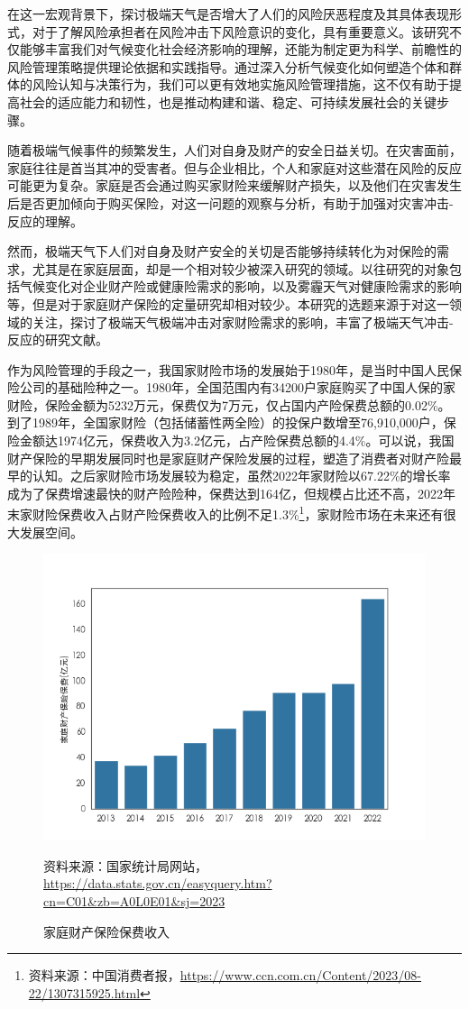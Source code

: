 在这一宏观背景下，探讨极端天气是否增大了人们的风险厌恶程度及其具体表现形式，对于了解风险承担者在风险冲击下风险意识的变化，具有重要意义。该研究不仅能够丰富我们对气候变化社会经济影响的理解，还能为制定更为科学、前瞻性的风险管理策略提供理论依据和实践指导。通过深入分析气候变化如何塑造个体和群体的风险认知与决策行为，我们可以更有效地实施风险管理措施，这不仅有助于提高社会的适应能力和韧性，也是推动构建和谐、稳定、可持续发展社会的关键步骤。

随着极端气候事件的频繁发生，人们对自身及财产的安全日益关切。在灾害面前，家庭往往是首当其冲的受害者。但与企业相比，个人和家庭对这些潜在风险的反应可能更为复杂。家庭是否会通过购买家财险来缓解财产损失，以及他们在灾害发生后是否更加倾向于购买保险，对这一问题的观察与分析，有助于加强对灾害冲击-反应的理解。

然而，极端天气下人们对自身及财产安全的关切是否能够持续转化为对保险的需求，尤其是在家庭层面，却是一个相对较少被深入研究的领域。以往研究的对象包括气候变化对企业财产险\citep{杨娜娜2019自然灾害与企业现金持有}或健康险\citep{赵强2021空气污染对商业健康保险需求的影响}需求的影响，以及雾霾天气对健康险需求的影响\citep{2018Something}等，但是对于家庭财产保险的定量研究却相对较少。本研究的选题来源于对这一领域的关注，探讨了极端天气极端冲击对家财险需求的影响，丰富了极端天气冲击-反应的研究文献。

作为风险管理的手段之一，我国家财险市场的发展始于1980年，是当时中国人民保险公司的基础险种之一。1980年，全国范围内有34200户家庭购买了中国人保的家财险，保险金额为5232万元，保费仅为7万元，仅占国内产险保费总额的0.02\%。到了1989年，全国家财险（包括储蓄性两全险）的投保户数增至76,910,000户，保险金额达1974亿元，保费收入为3.2亿元，占产险保费总额的4.4\%。可以说，我国财产保险的早期发展同时也是家庭财产保险发展的过程\citep{黄英君2008论我国产险公司分散性业务营销模式的创新}，塑造了消费者对财产险最早的认知。之后家财险市场发展较为稳定，虽然2022年家财险以67.22\%的增长率成为了保费增速最快的财产险险种，保费达到164亿，但规模占比还不高，2022年末家财险保费收入占财产险保费收入的比例不足1.3\%\footnote{资料来源：中国消费者报，\url{https://www.ccn.com.cn/Content/2023/08-22/1307315925.html}}，家财险市场在未来还有很大发展空间。
\begin{figure}[htbp]
    {\centering
    \includegraphics[width=0.8\linewidth]{img/家庭财产保险保费.png}\par }
    \caption{家庭财产保险保费收入}
    \qquad {} 资料来源：国家统计局网站，\url{https://data.stats.gov.cn/easyquery.htm?cn=C01&zb=A0L0E01&sj=2023}
\end{figure}


